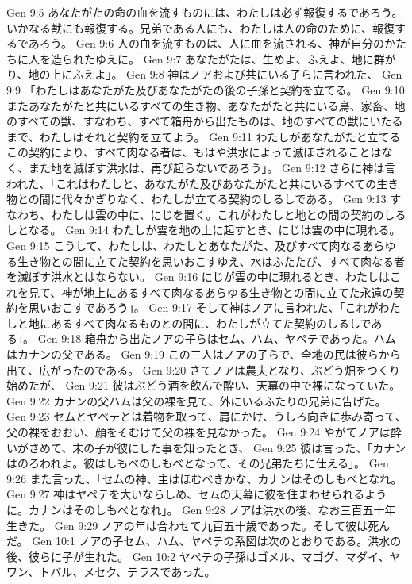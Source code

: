 Gen 9:5  あなたがたの命の血を流すものには、わたしは必ず報復するであろう。いかなる獣にも報復する。兄弟である人にも、わたしは人の命のために、報復するであろう。
Gen 9:6  人の血を流すものは、人に血を流される、神が自分のかたちに人を造られたゆえに。
Gen 9:7  あなたがたは、生めよ、ふえよ、地に群がり、地の上にふえよ」。
Gen 9:8  神はノアおよび共にいる子らに言われた、
Gen 9:9  「わたしはあなたがた及びあなたがたの後の子孫と契約を立てる。
Gen 9:10  またあなたがたと共にいるすべての生き物、あなたがたと共にいる鳥、家畜、地のすべての獣、すなわち、すべて箱舟から出たものは、地のすべての獣にいたるまで、わたしはそれと契約を立てよう。
Gen 9:11  わたしがあなたがたと立てるこの契約により、すべて肉なる者は、もはや洪水によって滅ぼされることはなく、また地を滅ぼす洪水は、再び起らないであろう」。
Gen 9:12  さらに神は言われた、「これはわたしと、あなたがた及びあなたがたと共にいるすべての生き物との間に代々かぎりなく、わたしが立てる契約のしるしである。
Gen 9:13  すなわち、わたしは雲の中に、にじを置く。これがわたしと地との間の契約のしるしとなる。
Gen 9:14  わたしが雲を地の上に起すとき、にじは雲の中に現れる。
Gen 9:15  こうして、わたしは、わたしとあなたがた、及びすべて肉なるあらゆる生き物との間に立てた契約を思いおこすゆえ、水はふたたび、すべて肉なる者を滅ぼす洪水とはならない。
Gen 9:16  にじが雲の中に現れるとき、わたしはこれを見て、神が地上にあるすべて肉なるあらゆる生き物との間に立てた永遠の契約を思いおこすであろう」。
Gen 9:17  そして神はノアに言われた、「これがわたしと地にあるすべて肉なるものとの間に、わたしが立てた契約のしるしである」。
Gen 9:18  箱舟から出たノアの子らはセム、ハム、ヤペテであった。ハムはカナンの父である。
Gen 9:19  この三人はノアの子らで、全地の民は彼らから出て、広がったのである。
Gen 9:20  さてノアは農夫となり、ぶどう畑をつくり始めたが、
Gen 9:21  彼はぶどう酒を飲んで酔い、天幕の中で裸になっていた。
Gen 9:22  カナンの父ハムは父の裸を見て、外にいるふたりの兄弟に告げた。
Gen 9:23  セムとヤペテとは着物を取って、肩にかけ、うしろ向きに歩み寄って、父の裸をおおい、顔をそむけて父の裸を見なかった。
Gen 9:24  やがてノアは酔いがさめて、末の子が彼にした事を知ったとき、
Gen 9:25  彼は言った、「カナンはのろわれよ。彼はしもべのしもべとなって、その兄弟たちに仕える」。
Gen 9:26  また言った、「セムの神、主はほむべきかな、カナンはそのしもべとなれ。
Gen 9:27  神はヤペテを大いならしめ、セムの天幕に彼を住まわせられるように。カナンはそのしもべとなれ」。
Gen 9:28  ノアは洪水の後、なお三百五十年生きた。
Gen 9:29  ノアの年は合わせて九百五十歳であった。そして彼は死んだ。
Gen 10:1  ノアの子セム、ハム、ヤペテの系図は次のとおりである。洪水の後、彼らに子が生れた。
Gen 10:2  ヤペテの子孫はゴメル、マゴグ、マダイ、ヤワン、トバル、メセク、テラスであった。
